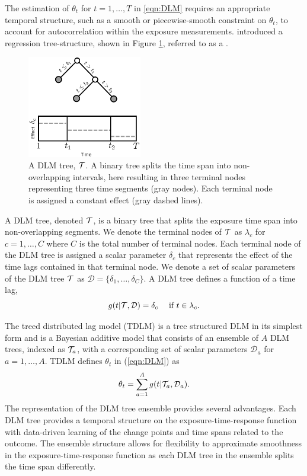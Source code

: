 The estimation of $\theta_t$ for $t = 1, \ldots, T$ in \eqref{eqn:DLM} requires an appropriate temporal structure, such as a smooth or piecewise-smooth constraint on $\theta_t$, to account for autocorrelation within the exposure measurements. \cite{mork_estimating_2023} introduced a regression tree-structure, shown in Figure \ref{fig:dlmtree}, referred to as a .
\begin{figure}[ht]
    \centering
    \includegraphics[width = 50mm]{images/dlmtree.png}
        \caption{A DLM tree, $\mathcal{T}$. A binary tree splits the time span into non-overlapping intervals, here resulting in three terminal nodes representing three time segments (gray nodes). Each terminal node is assigned a constant effect (gray dashed lines).}
    \label{fig:dlmtree}
\end{figure}
A DLM tree, denoted $\mathcal{T}$, is a binary tree that splits the exposure time span into non-overlapping segments. We denote the terminal nodes of $\mathcal{T}$ as $\lambda_c$ for $c = 1, \ldots, C$ where $C$ is the total number of terminal nodes. Each terminal node of the DLM tree is assigned a scalar parameter $\delta_c$ that represents the effect of the time lags contained in that terminal node. We denote a set of scalar parameters of the DLM tree $\mathcal{T}$ as $\mathcal{D} = \{\delta_1, \ldots, \delta_C\}$. A DLM tree defines a function of a time lag,
\begin{equation}
    g(t | \mathcal{T}, \mathcal{D}) = \delta_c \quad \text{ if } t \in \lambda_c.
    \label{eqn:g1}
\end{equation}

The treed distributed lag model (TDLM) is a tree structured DLM in its simplest form and is a Bayesian additive model that consists of an ensemble of $A$ DLM trees, indexed as $\mathcal{T}_a$, with a corresponding set of scalar parameters $\mathcal{D}_{a}$ for $a = 1, \dots, A$. TDLM defines $\theta_t$ in (\ref{eqn:DLM}) as
\begin{equation}
    \label{eqn:TDLM}
    \theta_{t} = \sum^A_{a = 1} g(t|\mathcal{T}_{a}, \mathcal{D}_{a}).
\end{equation}
The representation of the DLM tree ensemble provides several advantages. Each DLM tree provides a temporal structure on the exposure-time-response function with data-driven learning of the change points and time spans related to the outcome. The ensemble structure allows for flexibility to approximate smoothness in the exposure-time-response function as each DLM tree in the ensemble splits the time span differently.

